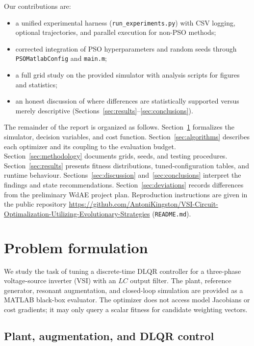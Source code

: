 \documentclass[pdflatex,sn-mathphys-num]{sn-jnl}
\begin{document}
Our contributions are:
\begin{itemize}
  \item a unified experimental harness (\texttt{run\_experiments.py}) with CSV logging, optional trajectories, and parallel execution for non-PSO methods;
  \item corrected integration of PSO hyperparameters and random seeds through \texttt{PSOMatlabConfig} and \texttt{main.m};
  \item a full grid study on the provided simulator with analysis scripts for figures and statistics;
  \item an honest discussion of where differences are statistically supported versus merely descriptive (Sections~\ref{sec:results}--\ref{sec:conclusions}).
\end{itemize}

The remainder of the report is organized as follows.
Section~\ref{sec:problem} formalizes the simulator, decision variables, and cost function.
Section~\ref{sec:algorithms} describes each optimizer and its coupling to the evaluation budget.
Section~\ref{sec:methodology} documents grids, seeds, and testing procedures.
Section~\ref{sec:results} presents fitness distributions, tuned-configuration tables, and runtime behaviour.
Sections~\ref{sec:discussion} and~\ref{sec:conclusions} interpret the findings and state recommendations.
Section~\ref{sec:deviations} records differences from the preliminary WdAE project plan.
Reproduction instructions are given in the public repository \url{https://github.com/AntoniKingston/VSI-Circuit-Optimalization-Utilizing-Evolutionary-Strategies} (\texttt{README.md}).

\section{Problem formulation}\label{sec:problem}

We study the task of tuning a discrete-time DLQR controller for a three-phase voltage-source inverter (VSI) with an $LC$ output filter.
The plant, reference generator, resonant augmentation, and closed-loop simulation are provided as a MATLAB black-box evaluator.
The optimizer does not access model Jacobians or cost gradients; it may only query a scalar fitness for candidate weighting vectors.

\subsection{Plant, augmentation, and DLQR control}\label{subsec:plant}
\end{document}
